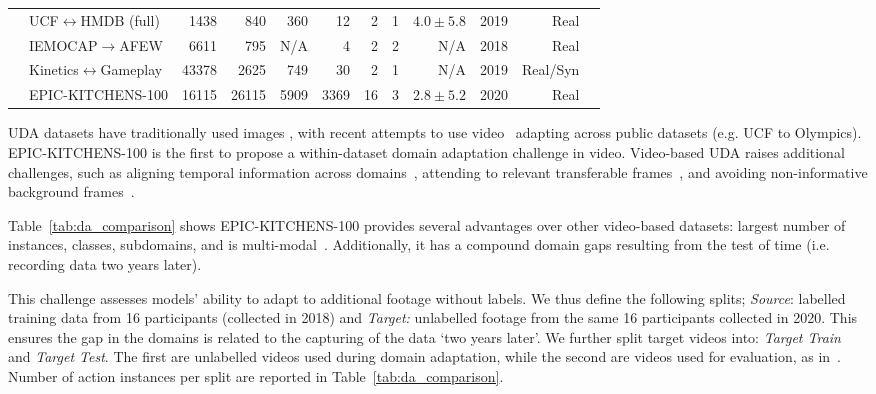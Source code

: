\documentclass[twocolumn]{svjour3}          \smartqed
\makeatletter
\newcommand{\chParagraph}[1]{\noindent {\textbf{#1.}} \hspace{6pt}}
\newcommand {\newDataset} {EPIC-KITCHENS-100}
\newcommand*{\eg}{e.g.\@\xspace}
\newcommand*{\ie}{i.e.\@\xspace}
\makeatother
\begin{document}
\begin{table*}[t!]
\begin{center}
{\begin{tabular}{llrrrrrrrrrr}
    & UCF$\leftrightarrow{}$HMDB (full) \cite{Chen2019}    & 1438  & 840 & 360 & 12     & 2 & 1 & $4.0 \pm 5.8$\hspace{30pt} & 2019   & Real\\
    & IEMOCAP$\rightarrow{}$AFEW \cite{qi2018unified} & 6611 &  795 & N/A & 4 & 2 & 2 & N/A\hspace{30pt} & 2018  & Real \\
    & Kinetics$\leftrightarrow{}$Gameplay \cite{Chen2019}  & 43378 & 2625 & 749 & 30     & 2 & 1 & N/A\hspace{30pt} & 2019    & Real/Syn \\
    & \newDataset         & 16115 & 26115 & 5909 & 3369       & 16 & 3 & $2.8 \pm 5.2$\hspace{30pt} & 2020    & Real\\
    \bottomrule
    \end{tabular}
    }
\end{center}
\end{table*}

\chParagraph{Related Datasets}
UDA datasets have traditionally used images \cite{Saenko2010,Venkateswara2017,Peng2017,Peng2019}, with recent attempts to use video~ \cite{jamal2018deep,Chen2019,qi2018unified} adapting across public datasets (\eg UCF to Olympics). \newDataset{} is the first to propose a within-dataset domain adaptation challenge in video.
Video-based UDA raises additional challenges, such as aligning temporal information across domains~\cite{jamal2018deep}, attending to relevant transferable frames~\cite{Chen2019}, and avoiding non-informative background frames~\cite{pan2019adversarial}.  

Table~\ref{tab:da_comparison} shows 
\newDataset{} provides 
several advantages over other video-based datasets: largest number of instances, classes, subdomains, and is multi-modal~\cite{munro2020multi}.  
Additionally, it has a compound domain gaps resulting from the test of time (\ie recording data two years later).

\chParagraph{Splits}
This challenge assesses models' ability to adapt to additional footage without labels. We thus define the following splits; \textit{Source}: labelled training data from 16 participants (collected in 2018) and \textit{Target:} unlabelled footage from the same 16 participants collected in 2020. This ensures the gap in the domains is related to the capturing of the data `two years later'. We further split target videos into: \textit{Target Train} and \textit{Target Test}. The first are unlabelled videos used during domain adaptation, while the second are videos used for evaluation, as in~\cite{Peng2017}. Number of action instances per split are reported in Table~\ref{tab:da_comparison}. 
\end{document}
